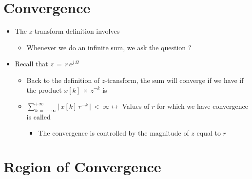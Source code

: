 \documentclass[12pt,a4paper]{book}
\begin{document}
\section{Convergence}

\begin{itemize}


\item The $z$-transform definition involves 

	\begin{itemize}
	\item Whenever we do an infinite sum, we ask the question   ?
	\end{itemize}
	
	
\item Recall that $z \, = \, r \, e^{j \, \Omega}$

	\begin{itemize}
	\item Back to the definition of $z$-transform, the sum will converge if we have if the product $x[k] \, \times \, z^{-k}$ is 

	\item $\displaystyle\sum_{k \, = \, - \infty}^{+ \infty} \lvert \,x[k] \,r^{-k} \,\rvert \, < \, \infty \leftrightarrow$  Values of $r$ for which we have convergence is called 
	
	\begin{itemize}
	    \item The convergence is controlled by the magnitude of $z$ equal to $r$
	\end{itemize}
	

\end{itemize}		 


\end{itemize}


\newpage
\section{Region of Convergence}
\end{document}
